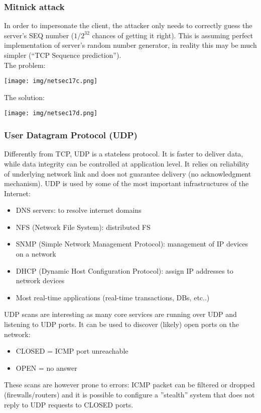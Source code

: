 \documentclass[a4paper, 10pt, titlepage]{article}
\begin{document}
\subsubsection{Mitnick attack}
In order to impersonate the client, the attacker only needs to correctly guess the server’s SEQ number ($1/2^{32}$ chances of getting it right). This is assuming perfect implementation of server’s random number generator, in reality this may be much simpler (“TCP Sequence prediction”). \medskip\\
The problem:
\begin{center}
	\texttt{[image: img/netsec17c.png]}
\end{center}
The solution:
\begin{center}
	\texttt{[image: img/netsec17d.png]}
\end{center}

\subsubsection{User Datagram Protocol (UDP)}
Differently from TCP, UDP is a stateless protocol. It is faster to deliver data, while data integrity can be controlled at application level. It relies on reliability of underlying network link and does not guarantee delivery (no acknowledgment mechanism). UDP is used by some of the most important infrastructures of the Internet:
\begin{itemize}
	\item DNS servers: to resolve internet domains
	\item NFS (Network File System): distributed FS
	\item SNMP (Simple Network Management Protocol): management of IP devices on a network
	\item DHCP (Dynamic Host Configuration Protocol): assign IP addresses to network devices
	\item Most real-time applications (real-time transactions, DBs, etc..)
\end{itemize}
UDP scans are interesting as many core services are running over UDP and listening to UDP ports. It can be used to discover (likely) open ports on the network:
\begin{itemize}
	\item CLOSED = ICMP port unreachable
	\item OPEN = no answer
\end{itemize}
These scans are however prone to errors: ICMP packet can be filtered or dropped (firewalls/routers) and it is possible to configure a ”stealth” system that does not reply to UDP requests to CLOSED ports.
\end{document}
